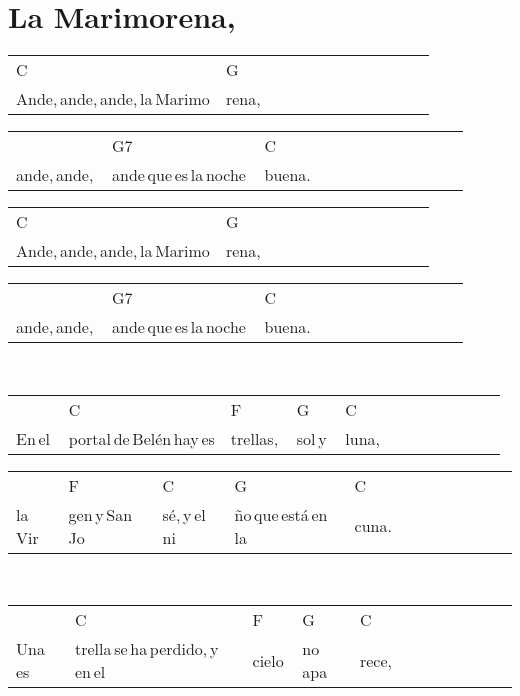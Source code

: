 \section*{La Marimorena, \hfill}
\begin{multicols}{2}
\noindent
\begin{minipage}{\columnwidth}
\noindent
\noindent
\begin{tabular}{llllllllllll}
C&G\\
Ande,\,ande,\,ande,\,la\,Marimo&rena,
\end{tabular}

\noindent
\begin{tabular}{llllllllllll}
&G7&C\\
ande,\,ande,\,&ande\,que\,es\,la\,noche\,&buena.
\end{tabular}

\noindent
\begin{tabular}{llllllllllll}
C&G\\
Ande,\,ande,\,ande,\,la\,Marimo&rena,
\end{tabular}

\noindent
\begin{tabular}{llllllllllll}
&G7&C\\
ande,\,ande,\,&ande\,que\,es\,la\,noche\,&buena.
\end{tabular}
\end{minipage}\\

\noindent
\begin{minipage}{\columnwidth}
\noindent
\noindent
\begin{tabular}{llllllllllll}
&C&F&G&C\\
En\,el\,&portal\,de\,Belén\,hay\,es&trellas,\,&sol\,y\,&luna,
\end{tabular}

\noindent
\begin{tabular}{llllllllllll}
&F&C&G&C\\
la\,Vir&gen\,y\,San\,Jo&sé,\,y\,el\,ni&ño\,que\,está\,en\,la\,&cuna.
\end{tabular}
\end{minipage}\\



\noindent
\begin{minipage}{\columnwidth}
\noindent
\noindent
\begin{tabular}{llllllllllll}
&C&F&G&C\\
Una\,es&trella\,se\,ha\,perdido,\,y\,en\,el\,&cielo\,&no\,apa&rece,
\end{tabular}


\end{minipage}
\end{multicols}
